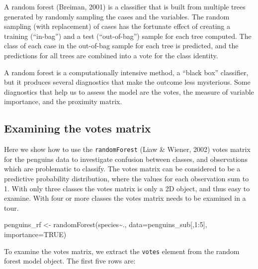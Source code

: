 \documentclass[
  letterpaper,
]{krantz}
\newenvironment{Shaded}{\begin{snugshade}}{\end{snugshade}}
\newcommand{\AttributeTok}[1]{\textcolor[rgb]{0.40,0.45,0.13}{#1}}
\newcommand{\ConstantTok}[1]{\textcolor[rgb]{0.56,0.35,0.01}{#1}}
\newcommand{\DecValTok}[1]{\textcolor[rgb]{0.68,0.00,0.00}{#1}}
\newcommand{\FunctionTok}[1]{\textcolor[rgb]{0.28,0.35,0.67}{#1}}
\newcommand{\NormalTok}[1]{\textcolor[rgb]{0.00,0.23,0.31}{#1}}
\newcommand{\OtherTok}[1]{\textcolor[rgb]{0.00,0.23,0.31}{#1}}
\newcommand{\SpecialCharTok}[1]{\textcolor[rgb]{0.37,0.37,0.37}{#1}}
\begin{document}

A random forest (Breiman, 2001) is a classifier that is built from
multiple trees generated by randomly sampling the cases and the
variables. The random sampling (with replacement) of cases has the
fortunate effect of creating a training (``in-bag'') and a test
(``out-of-bag'') sample for each tree computed. The class of each case
in the out-of-bag sample for each tree is predicted, and the predictions
for all trees are combined into a vote for the class identity.

A random forest is a computationally intensive method, a ``black box''
classifier, but it produces several diagnostics that make the outcome
less mysterious. Some diagnostics that help us to assess the model are
the votes, the measure of variable importance, and the proximity matrix.

\subsection{Examining the votes matrix}\label{sec-votes}

Here we show how to use the \texttt{randomForest} (Liaw \& Wiener, 2002)
votes matrix for the penguins data to investigate confusion between
classes, and observations which are problematic to classify. The votes
matrix can be considered to be a predictive probability distribution,
where the values for each observation sum to 1. With only three classes
the votes matrix is only a 2D object, and thus easy to examine. With
four or more classes the votes matrix needs to be examined in a tour.


\begin{Shaded}
\begin{Highlighting}[]
\NormalTok{penguins\_rf }\OtherTok{\textless{}{-}} \FunctionTok{randomForest}\NormalTok{(species}\SpecialCharTok{\textasciitilde{}}\NormalTok{.,}
                             \AttributeTok{data=}\NormalTok{penguins\_sub[,}\DecValTok{1}\SpecialCharTok{:}\DecValTok{5}\NormalTok{],}
                             \AttributeTok{importance=}\ConstantTok{TRUE}\NormalTok{)}
\end{Highlighting}
\end{Shaded}

To examine the votes matrix, we extract the \texttt{votes} element from
the random forest model object. The first five rows are:
\end{document}
